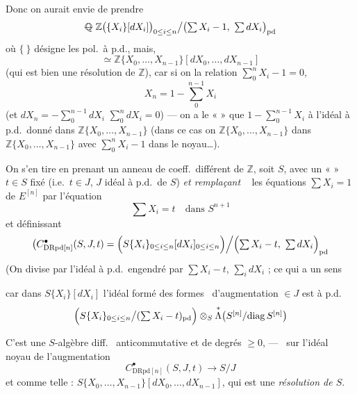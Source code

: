 \documentclass[11pt,a4paper]{article}
\begin{document}
Donc on aurait envie de prendre
\[ \text{\struck{$\mathbb{Q}$}}\ \mathbb{Z}\bigl(\{X_i\}[dX_i]\bigr)_{0 \leq i \leq n} \big/ \bigl(\textstyle\sum X_i - 1,\ \sum dX_i\bigr)_{\mathrm{pd}} \]
où $\{\ \}$ désigne les pol.\ à p.d., mais, \ill{} \ill{} 
\[ \simeq \mathbb{Z}\{X_0, \ldots, X_{n-1}\}[dX_0, \ldots, dX_{n-1}] \]
(qui est  bien une résolution de $\mathbb{Z}$), car si on    la relation $\sum_0^n X_i - 1 = 0$,
\[ X_n = 1 - \sum_0^{n-1} X_i \]
(et $dX_n = -\sum_0^{n-1} dX_i$  $\sum_0^n dX_i = 0$)
— on a le «  » que $1 - \sum_0^{n-1} X_i$  à l'idéal à p.d.\ donné dans $\mathbb{Z}\{X_0, \ldots, X_{n-1}\}$ (dans ce cas on  \ill{}  $\mathbb{Z}\{X_0, \ldots, X_{n-1}\}$ dans $\mathbb{Z}\{X_0, \ldots, X_{n-1}\}$ avec  \struck{\ill{}} $\sum_0^n X_i - 1$ dans le noyau…).

On s'en tire en prenant un anneau de coeff.\ différent de $\mathbb{Z}$, soit $S$, avec un «  » \struck{\ill{}} $t \in S$ fixé  (i.e.\ $t \in J$, $J$ idéal à p.d.\ de $S$) \struck{\ill{} \ill{} \ill{}} \emph{et remplaçant} \ \struck{\ill{}} les équations $\sum X_i = 1$ de $E^{[n]}$ par l'équation
\[ \sum X_i = t \quad \text{dans } S^{n+1} \]
et définissant
\[ \bigl(C^\bullet_{\mathrm{DRpd}[n]}(S,J,t) = \Bigl(S\{X_i\}_{0 \leq i \leq n}[dX_i]_{0 \leq i \leq n}\Bigr) \Big/ \Bigl(\textstyle\sum X_i - t,\ \sum dX_i\Bigr)_{\mathrm{pd}} \]
(On divise par l'idéal à p.d.\ engendré par $\sum X_i - t$, $\sum_i dX_i$ ; ce qui a un sens

car dans $S\{X_i\}[dX_i]$ l'idéal formé des formes \ d'augmentation $\in J$ est à p.d.
\[ \Bigl(S\{X_i\}_{0 \leq i \leq n} \big/ (\textstyle\sum X_i - t)_{\mathrm{pd}}\Bigr) \otimes_S \overset{*}{\Lambda}\bigl(S^{[n]}/\mathrm{diag}\,S^{[n]}\bigr) \]

C'est une $S$-algèbre diff.\  anticommutative et de degrés $\geq 0$,  — \ sur l'idéal noyau de l'augmentation
\[ C^\bullet_{\mathrm{DRpd}[n]}(S,J,t) \to S/J \]
et comme telle  \ill{} : $S\{X_0, \ldots, X_{n-1}\}[dX_0, \ldots, dX_{n-1}]$, qui est une \emph{résolution de $S$}. 
\end{document}
